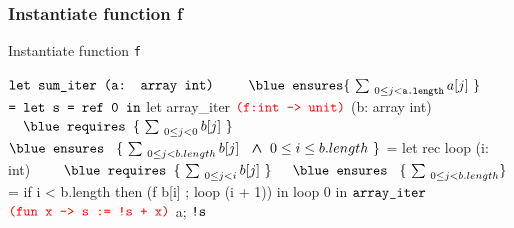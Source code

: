 \subsubsection*{Instantiate function f}
\begin{frame}[fragile]
{Instantiate function \texttt{f}}
\begin{footnotesize}
\begin{minipage}[t]{0.3\linewidth}
\begin{whycode} 
   $\color{black}\texttt{let sum\_iter (a: array int)}$
	$\hspace*{2em}\color{black}\texttt{\blue ensures}\{~\sum_{~0 \leq j < \texttt{a.length}} a[j]~\}$
   $\color{black}\texttt{=  let s = ref 0 in}$
      let array_iter $\textcolor{red}{\texttt{(f:int -> unit)}}$ (b: array int)
	      $\\ \hspace*{1em}\texttt{\blue requires }\{\Noir{~\sum_{~0 \leq j < 0} b[j]~}\} $
        $\\ \hspace*{0em}\texttt{\blue ensures  }~\{\Noir{~\sum_{~0 \leq j < b.length} b[j]}~\bwedge 0 \leq i \leq b.length~\}$ 
      = let rec loop (i: int)
	      $\\ \hspace*{2em}\texttt{\blue requires }\{\Noir{~\sum_{~0 \leq j < i} b[j]~}\} $
        $\\ \hspace*{1em}\texttt{\blue ensures  }~\{\Noir{~\sum_{~0 \leq j < b.length}}\}$
        = if i < b.length 
          then (f b[i] ; loop (i + 1)) 
        in loop 0   
      in ${\color{black}\texttt{array\_iter }}$ ${\color{red}\texttt{(fun x -> s := !s + x)}}$ a;
     ${\color{black}\texttt{!s}}$
\end{whycode}
\end{minipage}
\end{footnotesize}
\end{frame}
\addtocounter{framenumber}{-1}

